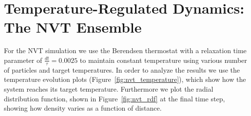 \section{Temperature-Regulated Dynamics: The NVT Ensemble}
For the NVT simulation we use the Berendsen thermostat with a relaxation time parameter of $\frac{dt}{\tau} = 0.0025$ to maintain constant temperature using various number of particles and target temperatures. In order to analyze the results we use the temperature evolution plots (Figure~\ref{fig:nvt_temperature}), which show how the system reaches its target temperature. Furthermore we plot the radial distribution function, shown in Figure~\ref{fig:nvt_rdf} at the final time step, showing how density varies as a function of distance.
